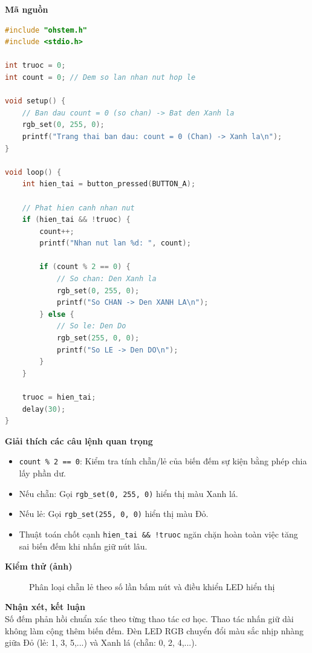 \noindent\textbf{Mã nguồn}\\
\begin{lstlisting}[language=C]
#include "ohstem.h"
#include <stdio.h>

int truoc = 0;
int count = 0; // Dem so lan nhan nut hop le

void setup() {
    // Ban dau count = 0 (so chan) -> Bat den Xanh la
    rgb_set(0, 255, 0);
    printf("Trang thai ban dau: count = 0 (Chan) -> Xanh la\n");
}

void loop() {
    int hien_tai = button_pressed(BUTTON_A);

    // Phat hien canh nhan nut
    if (hien_tai && !truoc) {
        count++;
        printf("Nhan nut lan %d: ", count);

        if (count % 2 == 0) {
            // So chan: Den Xanh la
            rgb_set(0, 255, 0);
            printf("So CHAN -> Den XANH LA\n");
        } else {
            // So le: Den Do
            rgb_set(255, 0, 0);
            printf("So LE -> Den DO\n");
        }
    }

    truoc = hien_tai;
    delay(30);
}
\end{lstlisting}

\noindent\textbf{Giải thích các câu lệnh quan trọng}\\
\begin{itemize}
    \item \texttt{count \% 2 == 0}: Kiểm tra tính chẵn/lẻ của biến đếm sự kiện bằng phép chia lấy phần dư.
    \item Nếu chẵn: Gọi \texttt{rgb\_set(0, 255, 0)} hiển thị màu Xanh lá.
    \item Nếu lẻ: Gọi \texttt{rgb\_set(255, 0, 0)} hiển thị màu Đỏ.
    \item Thuật toán chốt cạnh \texttt{hien\_tai \&\& !truoc} ngăn chặn hoàn toàn việc tăng sai biến đếm khi nhấn giữ nút lâu.
\end{itemize}

\noindent\textbf{Kiểm thử (ảnh)}\\
\begin{figure}[H]
    \centering
    \caption{Phân loại chẵn lẻ theo số lần bấm nút và điều khiển LED hiển thị}
    \label{fig:bt29}
\end{figure}

\noindent\textbf{Nhận xét, kết luận}\\
Số đếm phản hồi chuẩn xác theo từng thao tác cơ học. Thao tác nhấn giữ dài không làm cộng thêm biến đếm. Đèn LED RGB chuyển đổi màu sắc nhịp nhàng giữa Đỏ (lẻ: 1, 3, 5,...) và Xanh lá (chẵn: 0, 2, 4,...).


